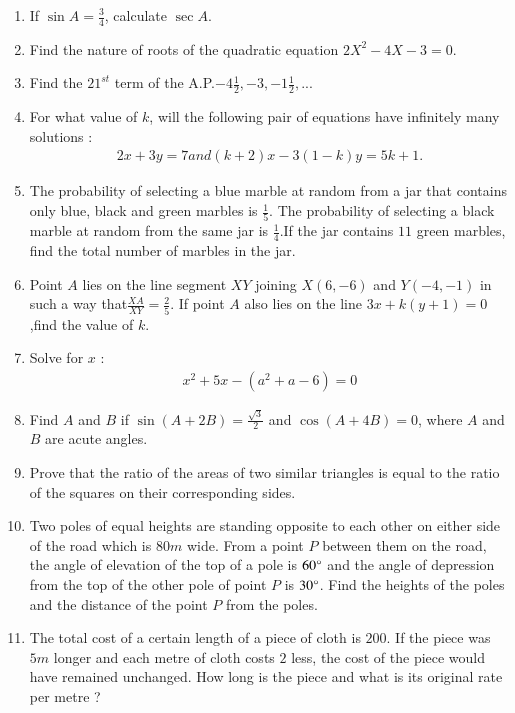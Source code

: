 \documentclass[12pt,-letter paper]{article}
\providecommand{\brak}[1]{\ensuremath{\left(#1\right)}}
\begin{document}
\begin{enumerate}
 \item If $\sin A = \frac{3}{4}$, calculate $\sec A$.
    

\item Find the nature of roots of the quadratic equation $2X^2-4X-3=0$.


\item Find the $21^{st}$ term of the A.P.$-4 \frac{1}{2},-3,-1\frac{1}{2},...$

\item For what value of $k$, will the following pair of equations have infinitely many solutions :
\begin{align*}
2x + 3y = 7 and  \brak{k+2}x - 3\brak{1-k}y = 5k+1 .
\end{align*}

\item The probability of selecting a blue marble at random from a jar that
contains only blue, black and green marbles is $\frac{1}{5}$. The probability of selecting a black marble at random from the same jar is $\frac{1}{4}$.If the jar contains $11$ green marbles, find the total number of marbles in the jar.

\item Point $A$ lies on the line segment $XY$ joining $X\brak{6, - 6}$ and $Y\brak{-4,-1}$ in such a way that$\frac{XA}{XY}=\frac{2}{5}$. If point $A$ also lies on the line $3x + k \brak{y + 1}= 0$,find the value of $k$.

\item Solve for $x$ :
\begin{align*}
x^2+5x-\brak{a^2 +a -6}=0
\end{align*}

\item Find $A$ and $B$ if $\sin \brak{A + 2B}=\frac{\sqrt{3}}{2}$ and $\cos \brak{A + 4B} = 0$, where $A$ and $B$ are acute angles.



\item Prove that the ratio of the areas of two similar triangles is equal to the ratio of the squares on their corresponding sides.

\item Two poles of equal heights are standing opposite to each other on either side of the road which is $80 m$ wide. From a point $P$ between them on the road, the angle of elevation of the top of a pole is $60\degree$ and the angle of depression from the top of the other pole of point $P$ is $30\degree$. Find the heights of the poles and the distance of the point $P$ from the poles.

\item The total cost of a certain length of a piece of cloth is {\rupee$200$}. If the piece was $5 m$ longer and each metre of cloth costs {\rupee $2$ less}, the cost of the piece would have remained unchanged. How long is the piece and what is its original rate per metre ?

\end{enumerate}
\end{document}
